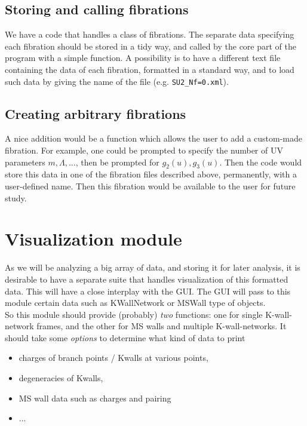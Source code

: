 \documentclass[11pt]{report}
\begin{document}
\subsection{Storing and calling fibrations}
We have a code that handles a class of fibrations. The separate data specifying each fibration should be stored in a tidy way, and called by the core part of the program with a simple function.
A possibility is to have a different text file containing the data of each fibration, formatted in a standard way, and to load such data by giving the name of the file (e.g. {\tt SU2\_Nf=0.xml}).

\subsection{Creating arbitrary fibrations}
A nice addition would be a function which allows the user to add a custom-made fibration. For example, one could be prompted to specify the number of UV parameters $m,\Lambda,\dots$, then be prompted for $g_{2}(u), g_{3}(u)$. Then the code would store this data in one of the fibration files described above, permanently, with a user-defined name. Then this fibration would be available to the user for future study.





\section{Visualization module}
As we will be analyzing a big array of data, and storing it for later analysis, it is desirable to have a separate suite that handles visualization of this formatted data.
This will have a close interplay with the GUI. The GUI will pass to this module certain data such as KWallNetwork or MSWall type of objects.\\
So this module should provide (probably) \emph{two} functions: one for single K-wall-network frames, and the other for MS walls and multiple K-wall-networks. 
It should take some \emph{options} to determine what kind of data to print 
\begin{itemize}
\item charges of branch points / Kwalls at various points, 
\item degeneracies of Kwalls, 
\item MS wall data such as charges and pairing
\item ...
\end{itemize}
\end{document}
